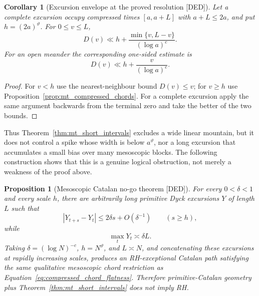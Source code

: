 \documentclass[11pt]{amsart}
\numberwithin{equation}{section}
\theoremstyle{plain}
\newtheorem{proposition}[theorem]{Proposition}
\newtheorem{corollary}[theorem]{Corollary}
\theoremstyle{definition}
\theoremstyle{remark}
\begin{document}
\begin{corollary}[Excursion envelope at the proved resolution \textnormal{[DED]}]
\label{cor:mt_excursion_envelope}
Let a complete excursion occupy compressed times $[a,a+L]$ with
$a+L\leq2a$, and put $h=(2a)^\vartheta$.  For $0\leq v\leq L$,
\begin{equation}
 D(v)\ll
 h+\frac{\min\{v,L-v\}}{(\log a)^c}.
\label{eq:mt_complete_envelope}
\end{equation}
For an open meander the corresponding one-sided estimate is
\begin{equation}
 D(v)\ll h+\frac{v}{(\log a)^c}.
\label{eq:mt_open_envelope}
\end{equation}
\end{corollary}

\begin{proof}
For $v<h$ use the nearest-neighbour bound $D(v)\leq v$; for $v\geq h$
use Proposition~\ref{prop:mt_compressed_chords}.  For a complete excursion
apply the same argument backwards from the terminal zero and take the better
of the two bounds.
\end{proof}

Thus Theorem~\ref{thm:mt_short_intervals} excludes a wide linear mountain,
but it does not control a spike whose width is below $a^\vartheta$, nor a
long excursion that accumulates a small bias over many mesoscopic blocks.
The following construction shows that this is a genuine logical obstruction,
not merely a weakness of the proof above.

\begin{proposition}[Mesoscopic Catalan no-go theorem \textnormal{[DED]}]
\label{prop:mt_catalan_no_go}
For every $0<\delta<1$ and every scale $h$, there are arbitrarily long
primitive Dyck excursions $Y$ of length $L$ such that
\begin{equation}
 |Y_{t+s}-Y_t|\leq 2\delta s+O(\delta^{-1})
 \qquad(s\geq h),
\label{eq:gentle_mountain_chords}
\end{equation}
while
\begin{equation}
 \max_tY_t\asymp\delta L.
\label{eq:gentle_mountain_height}
\end{equation}
Taking $\delta=(\log N)^{-c}$, $h=N^\vartheta$, and $L\asymp N$, and
concatenating these excursions at rapidly increasing scales, produces an
RH-exceptional Catalan path satisfying the same qualitative mesoscopic chord
restriction as Equation~\eqref{eq:compressed_chord_flatness}.
Therefore primitive-Catalan geometry plus Theorem~\ref{thm:mt_short_intervals}
does not imply RH.
\end{proposition}
\end{document}
